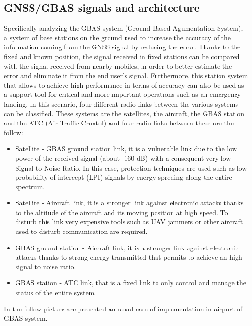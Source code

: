 \documentclass[12pt]{report}
\begin{document}
\subsection{GNSS/GBAS signals and architecture}
Specifically analyzing the GBAS system (Ground Based Agumentation System), a system of base stations on the ground used to increase the accuracy of the information coming from the GNSS signal by reducing the error. Thanks to the fixed and known position, the signal received in fixed stations can be compared with the signal received from nearby mobiles, in order to better estimate the error and eliminate it from the end user's signal. Furthermore, this station system that allows to achieve high performance in terms of accuracy can also be used as a support tool for critical and more important operations such as an emergency landing. In this scenario, four different radio links between the various systems can be classified. These systems are the satellites, the aircraft, the GBAS station and the ATC (Air Traffic Crontol) and four radio links between these are the follow:
\begin{itemize}
     \item Satellite - GBAS ground station link, it is a vulnerable link due to the low power of the received signal (about -160 dB) with a consequent very low Signal to Noise Ratio. In this case, protection techniques are used such as low probability of intercept (LPI) signals by energy spreding along the entire spectrum.
         
     \item Satellite - Aircraft link, it is a stronger link against electronic attacks thanks to the altitude of the aircraft and its moving position at high speed. To disturb this link very expensive tools such as UAV jammers or other aircraft used to disturb communication are required.
         
     \item GBAS ground station - Aircraft link, it is a stronger link against electronic attacks thanks to strong energy transmitted that permits to achieve an high signal to noise ratio.
        
    
     \item GBAS station - ATC link, that is a fixed link to only control and manage the status of the entire system.
        
\end{itemize}
In the follow picture are presented an usual case of implementation in airport of GBAS system.
\end{document}
